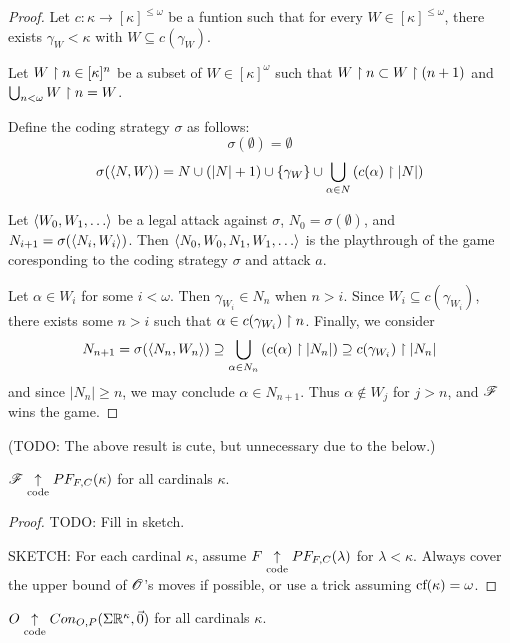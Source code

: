 \begin{proof}
Let $c:\kappa\to[\kappa]^{\leq \omega}$ be a funtion such that for every
$W\in[\kappa]^{\leq\omega}$, there exists $\gamma_W<\kappa$ with
$W\subseteq c(\gamma_W)$.

Let $W\restriction n \in [\kappa]^n$ be a subset of $W\in[\kappa]^\omega$ such that
$W\restriction n \subset W \restriction (n+1)$ and $\bigcup_{n<\omega} W\restriction n = W$.

Define the coding strategy $\sigma$ as follows:
  \[
    \sigma(\emptyset) = \emptyset
  \]
  \[
    \sigma(\langle N,W\rangle)
      =
    N
      \cup
    (|N|+1)
      \cup
    \{\gamma_W\}
      \cup
    \bigcup_{\alpha \in N}\left(c(\alpha) \restriction |N|\right)
  \]

Let $\<W_0,W_1,\dots\>$ be a legal attack against $\sigma$,
$N_0=\sigma(\emptyset)$, and
$N_{i+1}=\sigma(\langle N_i,W_i\rangle)$. Then $\<N_0,W_0,N_1,W_1,\dots\>$ is the
playthrough of the game coresponding to the coding strategy $\sigma$ and
attack $a$.

Let $\alpha\in W_i$ for some $i<\omega$. Then $\gamma_{W_i}\in N_n$ when
$n>i$. Since $W_i\subseteq c(\gamma_{W_i})$, there exists some $n>i$ such
that $\alpha\in c(\gamma_{W_i})\restriction n$.
Finally, we consider
  \[
    N_{n+1}
      =
    \sigma(\langle N_n,W_n\rangle)
      \supseteq
    \bigcup_{\alpha\in N_n}\left(c(\alpha) \restriction |N_n|\right)
      \supseteq
    c(\gamma_{W_i})\restriction |N_n|
  \]
and since $|N_n|\geq n$, we may conclude $\alpha\in N_{n+1}$.
Thus $\alpha\not\in W_j$ for $j>n$, and $\mathscr{F}$ wins the game.
\end{proof}

  (TODO: The above result is cute, but unnecessary due to the below.)

\begin{thm}
  $\mathscr{F} \underset{\text{code}}{\uparrow} PF_{F,C}(\kappa)$ for all cardinals $\kappa$.
\end{thm}

\begin{proof}
  TODO: Fill in sketch.

  SKETCH: For each cardinal
  $\kappa$, assume $F\underset{\text{code}}{\uparrow}PF_{F,C}(\lambda)$ for $\lambda<\kappa$. Always
  cover the upper bound of $\mathscr{O}$'s moves if possible, or use a trick
  assuming $\textrm{cf}(\kappa)=\omega$.
\end{proof}

\begin{cor}
  $O\underset{\text{code}}{\uparrow}Con_{O,P}(\Sigma\mathbb{R}^{\kappa},\vec{0})$
  for all cardinals $\kappa$.
\end{cor}
